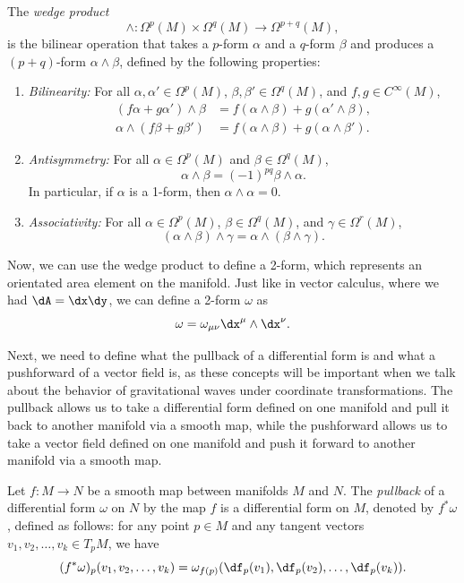 \begin{definition}
  The \emph{wedge product}
  \[%
    \wedge : \Omega^p(M) \times \Omega^q(M) \to \Omega^{p+q}(M)
  ,\]%
  is the bilinear operation that takes a $p$-form $\alpha$ and a $q$-form $\beta$ and produces a $(p+q)$-form $\alpha \wedge \beta$, defined by the following properties:
  \begin{enumerate}
    \item \emph{Bilinearity:} For all $\alpha, \alpha' \in \Omega^p(M)$, $\beta, \beta' \in \Omega^q(M)$, and $f, g \in C^\infty(M)$,
      \begin{align*}
        (f\alpha + g\alpha') \wedge \beta &= f(\alpha \wedge \beta) + g(\alpha' \wedge \beta), \\
        \alpha \wedge (f\beta + g\beta') &= f(\alpha \wedge \beta) + g(\alpha \wedge \beta').
      \end{align*}
    \item \emph{Antisymmetry:} For all $\alpha \in \Omega^p(M)$ and $\beta \in \Omega^q(M)$,
      \[%
        \alpha \wedge \beta = (-1)^{pq} \beta \wedge \alpha
      .\]%
      In particular, if $\alpha$ is a 1-form, then $\alpha \wedge \alpha = 0$.
    \item \emph{Associativity:} For all $\alpha \in \Omega^p(M)$, $\beta \in \Omega^q(M)$, and $\gamma \in \Omega^r(M)$,
      \[%
        (\alpha \wedge \beta) \wedge \gamma = \alpha \wedge (\beta \wedge \gamma)
      .\]%
  \end{enumerate}
\end{definition}

Now, we can use the wedge product to define a 2-form, which represents an orientated area element on the manifold. Just like in vector calculus, where we had $\dA = \dx\dy$, we can define a 2-form $\omega$ as
\[%
  \omega = \omega_{\mu\nu} \dx^\mu \wedge \dx^\nu
.\]%

Next, we need to define what the pullback of a differential form is and what a pushforward of a vector field is, as these concepts will be important when we talk about the behavior of gravitational waves under coordinate transformations. The pullback allows us to take a differential form defined on one manifold and pull it back to another manifold via a smooth map, while the pushforward allows us to take a vector field defined on one manifold and push it forward to another manifold via a smooth map.

\begin{definition}
  Let $f : M \to N$ be a smooth map between manifolds $M$ and $N$. The \emph{pullback} of a differential form $\omega$ on $N$ by the map $f$ is a differential form on $M$, denoted by $f^*\omega$, defined as follows: for any point $p \in M$ and any tangent vectors $v_1, v_2, \ldots, v_k \in T_pM$, we have
  \[%
    (f^*\omega)_p(v_1, v_2, \ldots, v_k) = \omega_{f(p)}(\df_p(v_1), \df_p(v_2), \ldots, \df_p(v_k))
  .\]%
\end{definition}


